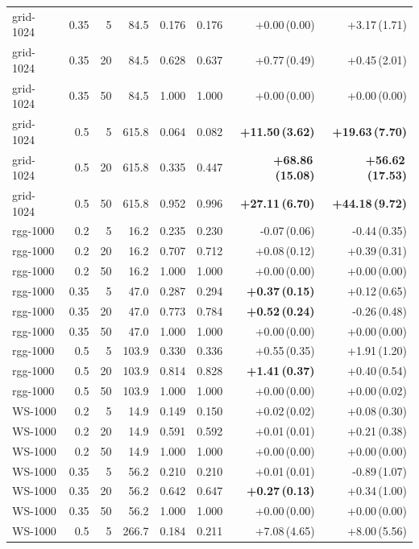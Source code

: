 \documentclass[preprint,11pt]{elsarticle}
\theoremstyle{definition}
\theoremstyle{remark}
\begin{document}
\begin{table}[h]
\begin{tabular}{lrrrrrrr}
grid-1024 & 0.35 & 5 & 84.5 & 0.176 & 0.176 & +0.00\,(0.00) & +3.17\,(1.71) \\
grid-1024 & 0.35 & 20 & 84.5 & 0.628 & 0.637 & +0.77\,(0.49) & +0.45\,(2.01) \\
grid-1024 & 0.35 & 50 & 84.5 & 1.000 & 1.000 & +0.00\,(0.00) & +0.00\,(0.00) \\
grid-1024 & 0.5 & 5 & 615.8 & 0.064 & 0.082 & \textbf{+11.50\,(3.62)} & \textbf{+19.63\,(7.70)} \\
grid-1024 & 0.5 & 20 & 615.8 & 0.335 & 0.447 & \textbf{+68.86\,(15.08)} & \textbf{+56.62\,(17.53)} \\
grid-1024 & 0.5 & 50 & 615.8 & 0.952 & 0.996 & \textbf{+27.11\,(6.70)} & \textbf{+44.18\,(9.72)} \\
rgg-1000 & 0.2 & 5 & 16.2 & 0.235 & 0.230 & -0.07\,(0.06) & -0.44\,(0.35) \\
rgg-1000 & 0.2 & 20 & 16.2 & 0.707 & 0.712 & +0.08\,(0.12) & +0.39\,(0.31) \\
rgg-1000 & 0.2 & 50 & 16.2 & 1.000 & 1.000 & +0.00\,(0.00) & +0.00\,(0.00) \\
rgg-1000 & 0.35 & 5 & 47.0 & 0.287 & 0.294 & \textbf{+0.37\,(0.15)} & +0.12\,(0.65) \\
rgg-1000 & 0.35 & 20 & 47.0 & 0.773 & 0.784 & \textbf{+0.52\,(0.24)} & -0.26\,(0.48) \\
rgg-1000 & 0.35 & 50 & 47.0 & 1.000 & 1.000 & +0.00\,(0.00) & +0.00\,(0.00) \\
rgg-1000 & 0.5 & 5 & 103.9 & 0.330 & 0.336 & +0.55\,(0.35) & +1.91\,(1.20) \\
rgg-1000 & 0.5 & 20 & 103.9 & 0.814 & 0.828 & \textbf{+1.41\,(0.37)} & +0.40\,(0.54) \\
rgg-1000 & 0.5 & 50 & 103.9 & 1.000 & 1.000 & +0.00\,(0.00) & +0.00\,(0.02) \\
WS-1000 & 0.2 & 5 & 14.9 & 0.149 & 0.150 & +0.02\,(0.02) & +0.08\,(0.30) \\
WS-1000 & 0.2 & 20 & 14.9 & 0.591 & 0.592 & +0.01\,(0.01) & +0.21\,(0.38) \\
WS-1000 & 0.2 & 50 & 14.9 & 1.000 & 1.000 & +0.00\,(0.00) & +0.00\,(0.00) \\
WS-1000 & 0.35 & 5 & 56.2 & 0.210 & 0.210 & +0.01\,(0.01) & -0.89\,(1.07) \\
WS-1000 & 0.35 & 20 & 56.2 & 0.642 & 0.647 & \textbf{+0.27\,(0.13)} & +0.34\,(1.00) \\
WS-1000 & 0.35 & 50 & 56.2 & 1.000 & 1.000 & +0.00\,(0.00) & +0.00\,(0.00) \\
WS-1000 & 0.5 & 5 & 266.7 & 0.184 & 0.211 & +7.08\,(4.65) & +8.00\,(5.56) \\

\end{tabular}
\end{table}
\end{document}
